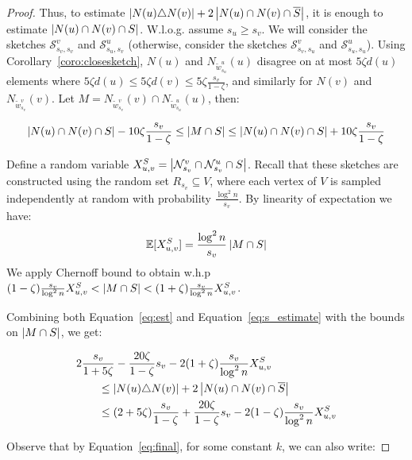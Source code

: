 \documentclass{article}
\newcommand{\Sk}{{\mathcal{S}}}
\begin{document}
\begin{proof}
Thus, to estimate $\left|N(u)\triangle N(v)\right|+ 2\left|N(u)\cap N(v)\cap \overline{S}\right| $, it is enough to estimate $\left|N(u) \cap N(v) \cap S\right|$. W.l.o.g. assume $s_u\ge s_v$. We will consider the sketches ${\Sk}^{v}_{s_v,s_v}$ and ${\Sk}^{u}_{s_u,s_v}$ (otherwise, consider the sketches ${\Sk}^{v}_{s_v,s_u}$ and ${\Sk}^{u}_{s_u,s_u}$). 
Using Corollary~\ref{coro:closesketch}, $N(u)$ and $N_{\tilde{w}^u_{s_u}}(u)$ disagree on at most  $5\zeta d(u)$ elements where $5\zeta d(u) \leq 5\zeta d(v) \leq 5\zeta \frac{s_v}{1-\zeta}$, and similarly for $N(v)$ and $N_{\tilde{w}^v_{s_v}}(v)$. Let $M=N_{\tilde{w}^v_{s_v}}(v) \cap N_{\tilde{w}^u_{s_u}}(u)$, then:

\begin{equation}\label{eq:s_estimate}
 \left|N(u) \cap N(v) \cap S\right| -10\zeta \frac{s_v}{1-\zeta} \leq
\left|M \cap S\right|
\leq \left|N(u) \cap N(v) \cap S\right|  +10\zeta \frac{s_v}{1-\zeta}
\end{equation}

Define a random variable $X^S_{u,v}=\left|{\mathcal{N}}^{v}_{s_v} \cap {\mathcal{N}}^{u}_{s_v} \cap S\right|$. 
Recall that these sketches are constructed using the random set $R_{s_v} \subseteq V$, where each vertex of $V$ is sampled independently at random with probability $\frac{\log^2 n}{s_v}$.
By linearity of expectation we have:
\begin{align*}
\mathbb{E}[X^S_{u,v}] = \frac{\log^2 n}{s_v}\left|M \cap S\right|  
\end{align*}
We apply Chernoff bound to obtain w.h.p 
$(1-\zeta)\frac{s_v}{\log^2 n}X^S_{u,v} < \left|M \cap S\right| < (1+\zeta)\frac{s_v}{\log^2 n}X^S_{u,v}$.

Combining both Equation~\ref{eq:est} and Equation~\ref{eq:s_estimate} with the bounds on $\left|M \cap S\right|$, we get:

\begin{equation}\label{eq:final}
\begin{aligned}
    &2\frac{s_v}{1+5\zeta}-\frac{20\zeta}{1-\zeta}s_v-2(1+\zeta)\frac{s_v}{\log^2 n}X^S_{u,v} \\
    &\qquad\leq \left|N(u)\triangle N(v)\right| + 2\left|N(u)\cap N(v)\cap \overline{S}\right| \\
    &\qquad\leq (2+5\zeta)\frac{s_v}{1-\zeta}+\frac{20\zeta}{1-\zeta}s_v-2(1-\zeta)\frac{s_v}{\log^2 n}X^S_{u,v}
\end{aligned}
\end{equation}

Observe that by Equation~\ref{eq:final}, for some constant $k$, we can also write:


\end{proof}
\end{document}
